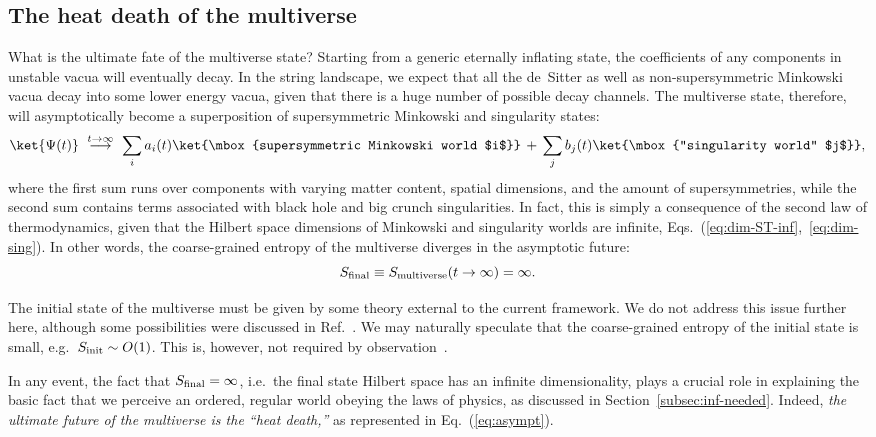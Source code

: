 \documentclass[12pt]{article}
\begin{document}
\subsection{The heat death of the multiverse}
\label{subsec:infinite}

What is the ultimate fate of the multiverse state?  Starting from a generic 
eternally inflating state, the coefficients of any components in unstable 
vacua will eventually decay.  In the string landscape, we expect that all 
the de~Sitter as well as non-supersymmetric Minkowski vacua decay into 
some lower energy vacua, given that there is a huge number of possible 
decay channels.  The multiverse state, therefore, will asymptotically 
become a superposition of supersymmetric Minkowski and singularity states:
%
\begin{equation}
  \ket{\Psi(t)} \,\,\stackrel{t \rightarrow \infty}{\longrightarrow}\,\, 
    \sum_i a_i(t) \ket{\mbox{supersymmetric Minkowski world $i$}}
  \,+\, \sum_j b_j(t) \ket{\mbox{``singularity world'' $j$}},
\label{eq:asympt}
\end{equation}
%
where the first sum runs over components with varying matter content, 
spatial dimensions, and the amount of supersymmetries, while the second 
sum contains terms associated with black hole and big crunch singularities. 
In fact, this is simply a consequence of the second law of thermodynamics, 
given that the Hilbert space dimensions of Minkowski and singularity 
worlds are infinite, Eqs.~(\ref{eq:dim-ST-inf},~\ref{eq:dim-sing}). 
In other words, the coarse-grained entropy of the multiverse diverges 
in the asymptotic future:
%
\begin{equation}
  S_{\rm final} \equiv S_{\rm multiverse}(t \rightarrow \infty) = \infty.
\label{eq:S-final}
\end{equation}
%

The initial state of the multiverse must be given by some theory external 
to the current framework.  We do not address this issue further here, 
although some possibilities were discussed in Ref.~\cite{Nomura:2011dt}. 
We may naturally speculate that the coarse-grained entropy of the initial 
state is small, e.g.\ $S_{\rm init} \sim O(1)$.  This is, however, not 
required by observation~\cite{Bousso}.

In any event, the fact that $S_{\rm final} = \infty$, i.e.\ the final 
state Hilbert space has an infinite dimensionality, plays a crucial role 
in explaining the basic fact that we perceive an ordered, regular world 
obeying the laws of physics, as discussed in Section~\ref{subsec:inf-needed}. 
Indeed, {\it the ultimate future of the multiverse is the ``heat death,''} 
as represented in Eq.~(\ref{eq:asympt}).
\end{document}
